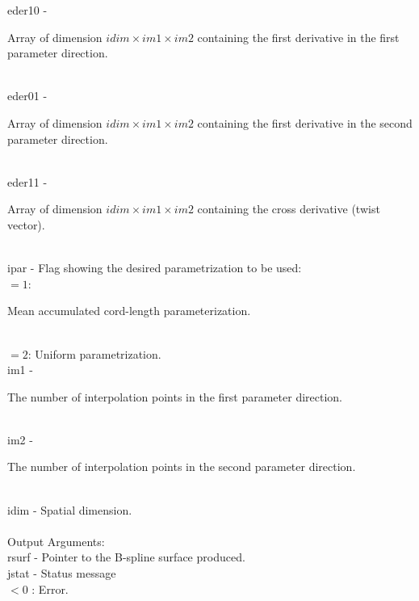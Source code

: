         \>\>    {\fov eder10} \> - \>
        \begin{minipg2}
          Array of dimension $idim\times im1\times im2$ containing the
          first derivative in the first parameter direction.
        \end{minipg2}\\[0.8ex]
        \>\>    {\fov eder01} \> - \>
        \begin{minipg2}
          Array of dimension $idim\times im1\times im2$ containing the
          first derivative in the second parameter direction.
        \end{minipg2}\\[0.8ex]
        \>\>    {\fov eder11} \> - \>
        \begin{minipg2}
          Array of dimension $idim\times im1\times im2$ containing the
          cross derivative (twist vector).
        \end{minipg2}\\[0.8ex]
        \>\>    {\fov ipar}   \> - \>
          Flag showing the desired parametrization to be used:\\
          \>\>\>\>$= 1$\>:
          \begin{minipg5}
            Mean accumulated cord-length para\-meter\-ization.
          \end{minipg5}\\[0.8ex]
          \>\>\>\>$= 2$\>: Uniform parametrization.\\
        \>\>    {\fov im1}    \> - \>
        \begin{minipg2}
          The number of interpolation points in the first parameter
          direction.
        \end{minipg2}\\[0.8ex]
        \>\>    {\fov im2}    \> - \>
        \begin{minipg2}
          The number of interpolation points in the second parameter
          direction.
        \end{minipg2}\\[0.8ex]
        \>\>    {\fov idim}   \> - \> Spatial dimension.\\
\\
        \>Output Arguments:\\
        \>\>    {\fov rsurf}  \> - \> Pointer to the B-spline surface produced.\\
        \>\>    {\fov jstat}  \> - \> Status message\\
                \>\>\>\>\> $< 0$ : Error.\\

